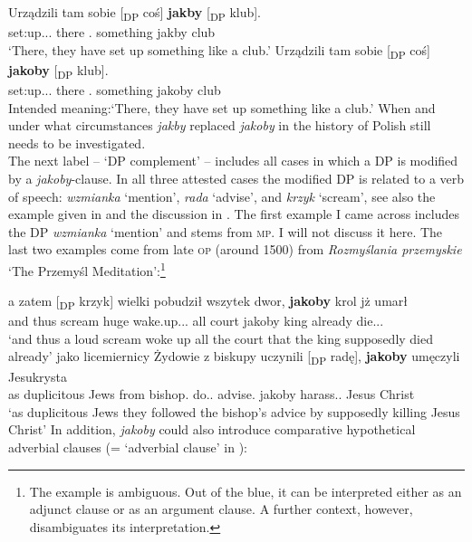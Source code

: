 \documentclass[output=paper
,modfonts
,nonflat]{langsci/langscibook}
\begin{document}
\ea \ea \gll	Urządzili tam sobie [\textsubscript{DP} coś] \textbf{jakby} \hspace{1,0cm} [\textsubscript{DP} klub]. \\
		set:up.{\lptcp}.{\vir}.{\thirdperson}{\pl} there {}.{\dat} {} something jakby {} {} club \\ 
	\glt	`There, they have set up something like a club.'     
	\ex\gll		*Urządzili tam sobie [\textsubscript{DP} coś] \textbf{jakoby} \hspace{1,0cm} [\textsubscript{DP} klub]. \\
            set:up.{\lptcp}.{\vir}.{\thirdperson}{\pl} there {}.{\dat} {} something jakoby {} {} club \\ 
	\glt	Intended meaning:`There, they have set up something like a club.'	       
    \z\z		
When and under what circumstances \emph{jakby} replaced \emph{jakoby} in the history of Polish still needs to be investigated. \\ The next label – `DP complement' – includes all cases in which a DP is modified by a \emph{jakoby}-clause. In all three attested cases the modified DP is related to a verb of speech: \emph{wzmianka} `mention', \emph{rada} `advise', and \emph{krzyk} `scream', see also the example given in  and the discussion in . The first example I came across includes the DP \emph{wzmianka} `mention' and stems from \textsc{mp}. I will not discuss it here. The last two examples come from late \textsc{op} (around 1500) from \emph{Rozmyślania przemyskie} `The Przemyśl Meditation':\footnote{The example  is ambiguous. Out of the blue, it can be interpreted either as an adjunct clause or as an argument clause. A further context, however, disambiguates its interpretation.
}          

\ea \ea \gll	a zatem [\textsubscript{DP} krzyk] wielki pobudził wszytek dwor, \textbf{jakoby} krol jż umarł \label{adjunct_argument} \\
		and thus {} scream huge wake.up.{\lptcp}.{\sg}.{\masc} all court jakoby king already die.{\lptcp}.{\sg}.{\masc} \\
	\glt	`and thus a loud scream woke up all the court that  the king supposedly died already'  
	\ex\gll		jako licemiernicy Żydowie z biskupy uczynili \hspace{1,0cm} [\textsubscript{DP} radę], \textbf{jakoby} umęczyli Jesukrysta \\
            as duplicitous Jews from bishop.{\gen} do.{\lptcp}.{\vir} {} {} advise.{\acc} jakoby harass.{\lptcp}.{\vir} {Jesus Christ} \\   
	\glt	 `as duplicitous Jews they followed the bishop's advice by supposedly killing Jesus Christ'  
    \z\z		
In addition, \emph{jakoby} could also introduce comparative hypothetical adverbial clauses (= `adverbial clause' in ):
\end{document}
